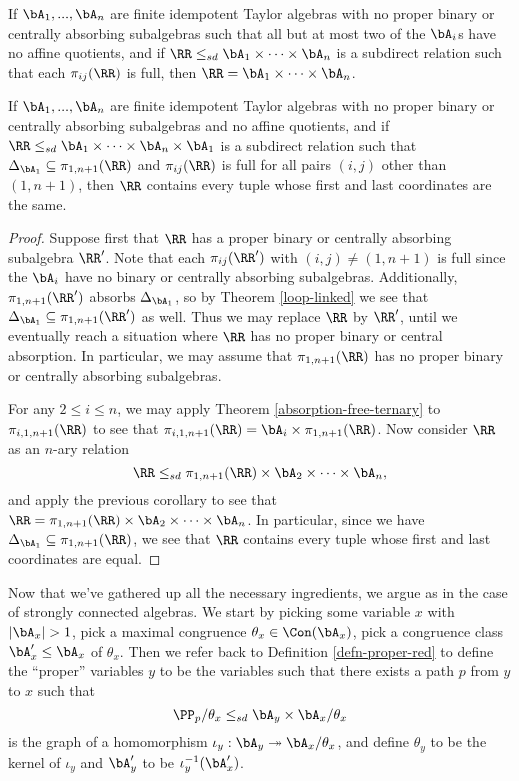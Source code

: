 \begin{cor}\label{cor-abs-free-arc} If $\bA_1, ..., \bA_n$ are finite idempotent Taylor algebras with no proper binary or centrally absorbing subalgebras such that all but at most two of the $\bA_i$s have no affine quotients, and if $\RR \le_{sd} \bA_1 \times \cdots \times \bA_n$ is a subdirect relation such that each $\pi_{ij}(\RR)$ is full, then $\RR = \bA_1 \times \cdots \times \bA_n$.
\end{cor}

\begin{cor}\label{cor-abs-free-pq} If $\bA_1, ..., \bA_n$ are finite idempotent Taylor algebras with no proper binary or centrally absorbing subalgebras and no affine quotients, and if $\RR \le_{sd} \bA_1 \times \cdots \times \bA_n \times \bA_1$ is a subdirect relation such that $\Delta_{\bA_1} \subseteq \pi_{1,n+1}(\RR)$ and $\pi_{ij}(\RR)$ is full for all pairs $(i,j)$ other than $(1,n+1)$, then $\RR$ contains every tuple whose first and last coordinates are the same.
\end{cor}
\begin{proof} Suppose first that $\RR$ has a proper binary or centrally absorbing subalgebra $\RR'$. Note that each $\pi_{ij}(\RR')$ with $(i,j) \ne (1,n+1)$ is full since the $\bA_i$ have no binary or centrally absorbing subalgebras. Additionally, $\pi_{1,n+1}(\RR')$ absorbs $\Delta_{\bA_1}$, so by Theorem \ref{loop-linked} we see that $\Delta_{\bA_1} \subseteq \pi_{1,n+1}(\RR')$ as well. Thus we may replace $\RR$ by $\RR'$, until we eventually reach a situation where $\RR$ has no proper binary or central absorption. In particular, we may assume that $\pi_{1,n+1}(\RR)$ has no proper binary or centrally absorbing subalgebras.

For any $2 \le i \le n$, we may apply Theorem \ref{absorption-free-ternary} to $\pi_{i,1,n+1}(\RR)$ to see that $\pi_{i,1,n+1}(\RR) = \bA_i \times \pi_{1,n+1}(\RR)$. Now consider $\RR$ as an $n$-ary relation
\[
\RR \le_{sd} \pi_{1,n+1}(\RR) \times \bA_2 \times \cdots \times \bA_n,
\]
and apply the previous corollary to see that $\RR = \pi_{1,n+1}(\RR) \times \bA_2 \times \cdots \times \bA_n$. In particular, since we have $\Delta_{\bA_1} \subseteq \pi_{1,n+1}(\RR)$, we see that $\RR$ contains every tuple whose first and last coordinates are equal.
\end{proof}

Now that we've gathered up all the necessary ingredients, we argue as in the case of strongly connected algebras. We start by picking some variable $x$ with $|\bA_x| > 1$, pick a maximal congruence $\theta_x \in \Con(\bA_x)$, pick a congruence class $\bA_x' \le \bA_x$ of $\theta_x$. Then we refer back to Definition \ref{defn-proper-red} to define the ``proper'' variables $y$ to be the variables such that there exists a path $p$ from $y$ to $x$ such that
\[
\PP_p/\theta_x \le_{sd} \bA_y \times \bA_x/\theta_x
\]
is the graph of a homomorphism $\iota_y : \bA_y \twoheadrightarrow \bA_x/\theta_x$, and define $\theta_y$ to be the kernel of $\iota_y$ and $\bA_y'$ to be $\iota_y^{-1}(\bA_x')$.

